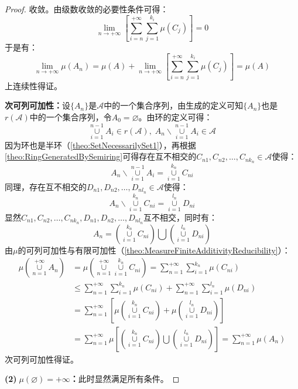 \begin{proof}
	收敛。由级数收敛的必要性条件可得：
	\begin{equation*}
		\lim_{n\to+\infty}\left[\sum_{i=n}^{+\infty}\sum_{j=1}^{k_i}\mu(C_j)\right]=0
	\end{equation*}
	于是有：
	\begin{equation*}
		\lim_{n\to+\infty}\mu(A_n)=\mu(A)+\lim_{n\to+\infty}\left[\sum_{i=n}^{+\infty}\sum_{j=1}^{k_i}\mu(C_j)\right]=\mu(A)
	\end{equation*}
	上连续性得证。\par
	\textbf{次可列可加性：}设$\{A_n\}$是$\mathscr{A}$中的一个集合序列，由生成的定义可知$\{A_n\}$也是$r(\mathscr{A})$中的一个集合序列，令$A_0=\varnothing$。由环的定义可得：
	\begin{equation*}
		\underset{i=1}{\overset{n-1}{\cup}}A_i\in r(\mathscr{A}),\;A_n\backslash\underset{i=1}{\overset{n-1}{\cup}}A_i\in\mathscr{A}
	\end{equation*}
	因为环也是半环（\cref{theo:SetNecessarilySet1}），再根据\cref{theo:RingGeneratedBySemiring}可得存在互不相交的$C_{n1},C_{n2},\dots,C_{nk_n}\in\mathscr{A}$使得：
	\begin{equation*}
		A_n\backslash\underset{i=1}{\overset{n-1}{\cup}}A_i=\underset{i=1}{\overset{k_n}{\cup}}C_{ni}
	\end{equation*}
	同理，存在互不相交的$D_{n1},D_{n2},\dots,D_{nl_n}\in\mathscr{A}$使得：
	\begin{equation*}
		A_n\backslash\underset{i=1}{\overset{k_n}{\cup}}C_{ni}=\underset{i=1}{\overset{l_n}{\cup}}D_{ni}
	\end{equation*}
	显然$C_{n1},C_{n2},\dots,C_{nk_n},D_{n1},D_{n2},\dots,D_{nl_n}$互不相交，同时有：
	\begin{equation*}
		A_n=\left(\underset{i=1}{\overset{k_n}{\cup}}C_{ni}\right)\bigcup\left(\underset{i=1}{\overset{l_n}{\cup}}D_{ni}\right)
	\end{equation*}
	由$\mu$的可列可加性与有限可加性（\cref{theo:MeasureFiniteAdditivityReducibility}）：
	\begin{align*}
		\mu\left(\underset{n=1}{\overset{+\infty}{\cup}}A_n\right)
		&=\mu\left(\underset{n=1}{\overset{+\infty}{\cup}}\underset{i=1}{\overset{k_n}{\cup}}C_{ni}\right) =\sum_{n=1}^{+\infty}\sum_{i=1}^{k_n}\mu(C_{ni}) \\
		&\leqslant\sum_{n=1}^{+\infty}\sum_{i=1}^{k_n}\mu(C_{ni})+\sum_{n=1}^{+\infty}\sum_{i=1}^{l_n}\mu(D_{ni}) \\
		&=\sum_{n=1}^{+\infty}\left[\mu\left(\underset{i=1}{\overset{k_n}{\cup}}C_{ni}\right)+\mu\left(\underset{i=1}{\overset{l_n}{\cup}}D_{ni}\right)\right] \\
		&=\sum_{n=1}^{+\infty}\mu\left[\left(\underset{i=1}{\overset{k_n}{\cup}}C_{ni}\right)\bigcup\left(\underset{i=1}{\overset{l_n}{\cup}}D_{ni}\right)\right]=\sum_{n=1}^{+\infty}\mu(A_n)
	\end{align*}
	次可列可加性得证。\par
	\textbf{(2)$\;\mu(\varnothing)=+\infty$：}此时显然满足所有条件。
\end{proof}
